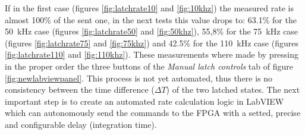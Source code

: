 If in the first case (figures \ref{fig:latchrate10} and \ref{fig:10khz}) the measured rate is almost 100\% of the sent one, in the next tests this value drops to:
63.1\% for the 50~kHz case (figures \ref{fig:latchrate50} and \ref{fig:50khz}),
55,8\% for the 75~kHz case (figures \ref{fig:latchrate75} and \ref{fig:75khz}) and
42.5\% for the 110~kHz case (figures \ref{fig:latchrate110} and \ref{fig:110khz}).
\newline
\noindent These measurements where made by pressing in the proper order the three buttons of the \textit{Manual latch controls} tab of figure \ref{fig:newlabviewpanel}.
This process is not yet automated, thus there is no consistency between the time difference ($\Delta T$) of the two latched states.
The next important step is to create an automated rate calculation logic in LabVIEW which can autonomously send the commands to the FPGA with a setted, precise and configurable delay (integration time).
